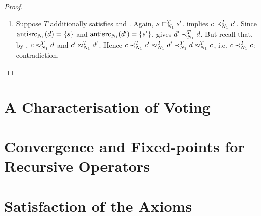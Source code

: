 \begin{proof}
\begin{enumerate}
        \item Suppose $T$ additionally satisfies \sourceposresp{} and
              \anticoherence{}. Again, $s \sqsubset_{N_1}^T s'$. \claimcoherence{}
              implies $c \prec_{N_1}^T c'$. Since $\operatorname{antisrc}_{N_1}(d) = \{s\}$
              and $\operatorname{antisrc}_{N_1}(d') = \{s'\}$, \anticoherence{} gives $d'
              \prec_{N_1}^T d$. But recall that, by \symmetry{}, $c \approx_{N_1}^T
              d$ and $c' \approx_{N_1}^T d'$. Hence $c \prec_{N_1}^T c'
              \approx_{N_1}^T d' \prec_{N_1}^T d \approx_{N_1}^T c$, i.e. $c
              \prec_{N_1}^T c$: contradiction.
    \end{enumerate}
\end{proof}

\section{A Characterisation of Voting}
\label{td_new_sec_a_characterisation_of_voting}

\section{Convergence and Fixed-points for Recursive Operators}
\label{td_new_sec_convergence_fixed_points}



\section{Satisfaction of the Axioms}

